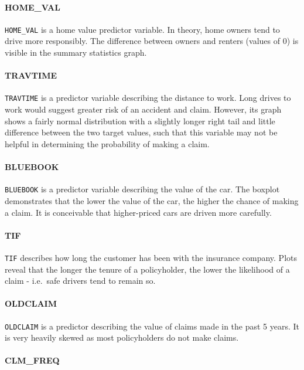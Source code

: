 \documentclass[]{article}
\let\oldparagraph\paragraph
\renewcommand{\paragraph}[1]{\oldparagraph{#1}\mbox{}}
\begin{document}
\paragraph{HOME\_VAL}\label{home_val}

\texttt{HOME\_VAL} is a home value predictor variable. In theory, home
owners tend to drive more responsibly. The difference between owners and
renters (values of 0) is visible in the summary statistics graph.

\paragraph{TRAVTIME}\label{travtime}

\texttt{TRAVTIME} is a predictor variable describing the distance to
work. Long drives to work would suggest greater risk of an accident and
claim. However, its graph shows a fairly normal distribution with a
slightly longer right tail and little difference between the two target
values, such that this variable may not be helpful in determining the
probability of making a claim.

\paragraph{BLUEBOOK}\label{bluebook}

\texttt{BLUEBOOK} is a predictor variable describing the value of the
car. The boxplot demonstrates that the lower the value of the car, the
higher the chance of making a claim. It is conceivable that
higher-priced cars are driven more carefully.

\paragraph{TIF}\label{tif}

\texttt{TIF} describes how long the customer has been with the insurance
company. Plots reveal that the longer the tenure of a policyholder, the
lower the likelihood of a claim - i.e.~safe drivers tend to remain so.

\paragraph{OLDCLAIM}\label{oldclaim}

\texttt{OLDCLAIM} is a predictor describing the value of claims made in
the past 5 years. It is very heavily skewed as most policyholders do not
make claims.

\paragraph{CLM\_FREQ}\label{clm_freq}
\end{document}
